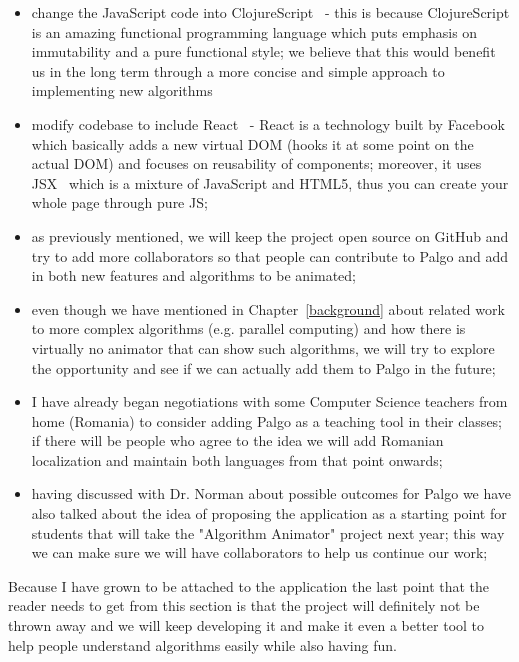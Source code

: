 \documentclass{l4proj}
\begin{document}
\begin{itemize}
  \item change the JavaScript code into ClojureScript~\cite{clojurescript} - this is because ClojureScript is an
    amazing functional programming language which puts emphasis on immutability and a pure functional style; we
    believe that this would benefit us in the long term through a more concise and simple approach to implementing new
    algorithms
  \item modify codebase to include React~\cite{react} - React is a technology built by Facebook which basically adds a
    new virtual DOM (hooks it at some point on the actual DOM) and focuses on reusability of components; moreover, it
    uses JSX~\cite{jsx} which is a mixture of JavaScript and HTML5, thus you can create your whole page through pure
    JS; 
  \item as previously mentioned, we will keep the project open source on GitHub and try to add more collaborators so
    that people can contribute to Palgo and add in both new features and algorithms to be animated;
  \item even though we have mentioned in Chapter~\ref{background} about related work to more complex algorithms (e.g.
    parallel computing) and how there is virtually no animator that can show such algorithms, we will try to explore
    the opportunity and see if we can actually add them to Palgo in the future;
  \item I have already began negotiations with some Computer Science teachers from home (Romania) to consider adding
    Palgo as a teaching tool in their classes; if there will be people who agree to the idea we will add Romanian
    localization and maintain both languages from that point onwards;
  \item having discussed with Dr. Norman about possible outcomes for Palgo we have also talked about the idea of
    proposing the application as a starting point for students that will take the "Algorithm Animator" project next
    year; this way we can make sure we will have collaborators to help us continue our work;
\end{itemize}

Because I have grown to be attached to the application the last point that the reader needs to get from this
section is that the project will definitely not be thrown away and we will keep developing it and make it even a
better tool to help people understand algorithms easily while also having fun.
\end{document}
